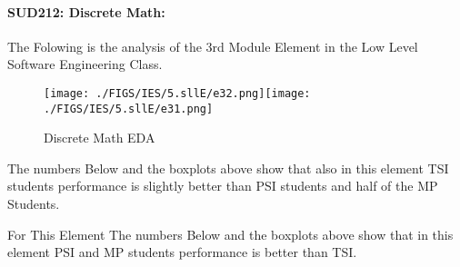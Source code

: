 \documentclass[12pt]{extreport}
\begin{document}

\paragraph{\large SUD212: Discrete Math:\\
}  The Folowing is the analysis of the 3rd Module Element in the Low Level Software Engineering Class.

\begin{figure}[H]
	\centering
	\texttt{[image: ./FIGS/IES/5.sllE/e32.png]}\texttt{[image: ./FIGS/IES/5.sllE/e31.png]}
	\caption{Discrete Math EDA}
	\label{fig:63}
\end{figure}

The numbers Below and the boxplots above show that also in this element  TSI students performance is slightly better than PSI students and half of the MP Students.

For This Element The numbers Below and the boxplots above show that in this element  PSI and MP students performance is  better than TSI.
\end{document}
